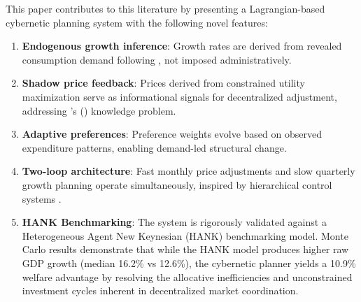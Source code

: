 This paper contributes to this literature by presenting a
Lagrangian-based cybernetic planning system with the following novel
features:
%
\begin{enumerate}
    \item \textbf{Endogenous growth inference}: Growth rates are derived
          from revealed consumption demand following
          \citet{samuelson1948consumption}, not imposed administratively.
          
    \item \textbf{Shadow price feedback}: Prices derived from constrained
          utility maximization serve as informational signals for
          decentralized adjustment, addressing
          \citeauthor{hayek1945use}'s (\citeyear{hayek1945use}) knowledge
          problem.

    \item \textbf{Adaptive preferences}: Preference weights evolve based
          on observed expenditure patterns, enabling demand-led structural
          change.

    \item \textbf{Two-loop architecture}: Fast monthly price adjustments
          and slow quarterly growth planning operate simultaneously,
          inspired by hierarchical control systems
          \citep{mesarovic1970theory}.

    \item \textbf{HANK Benchmarking}: The system is rigorously validated against 
          a Heterogeneous Agent New Keynesian (HANK) benchmarking model. 
          Monte Carlo results demonstrate that while the HANK model produces 
          higher raw GDP growth (median 16.2\% vs 12.6\%), the cybernetic planner 
          yields a 10.9\% welfare advantage by resolving the allocative 
          inefficiencies and unconstrained investment cycles inherent in 
          decentralized market coordination.
\end{enumerate}

